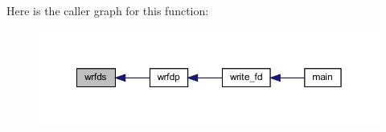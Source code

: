 Here is the caller graph for this function\+:
\nopagebreak
\begin{figure}[H]
\begin{center}
\leavevmode
\includegraphics[width=350pt]{Marco_8f90_a9de61739c99930796cb75809668c8f06_icgraph}
\end{center}
\end{figure}
\mbox{\label{Marco_8f90_a40bbec6873c0b2861fc37b59000aa0b2}} 
